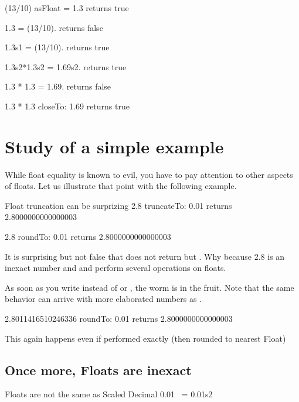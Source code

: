 \documentclass[a4paper,10pt,twoside]{book}
\begin{document}
\begin{code}{}
(13/10) asFloat = 1.3
	returns true

1.3 = (13/10).
	returns false
	
1.3s1 = (13/10).
	returns true

1.3s2*1.3s2 = 1.69s2.
	returns true

1.3 * 1.3 = 1.69.
	returns false

1.3 * 1.3 closeTo: 1.69
	returns true
\end{code}


\section{Study of a simple example}
While float equality is known to evil, you have to pay attention to other aspects of floats. Let us illustrate that point with the following example.

\begin{code}{Float truncation can be surprizing}
2.8 truncateTo: 0.01
	returns 2.8000000000000003

2.8 roundTo: 0.01
	returns 2.8000000000000003
\end{code}

It is surprising but not false that  does not return  but . Why because 2.8 is an inexact number and  and  perform several operations on floats.


As soon as you write  instead of  or , the worm is
in the fruit. Note that the same behavior can arrive with more elaborated numbers as .
\begin{code}{}
2.8011416510246336 roundTo: 0.01
	returns 2.8000000000000003
\end{code}



This again happens even if performed exactly (then rounded to nearest Float)





\subsection{Once more, Floats are inexact}

\begin{code}{Floats are not the same as Scaled Decimal}
   0.01 ~= 0.01s2
\end{code}
      
\end{document}
